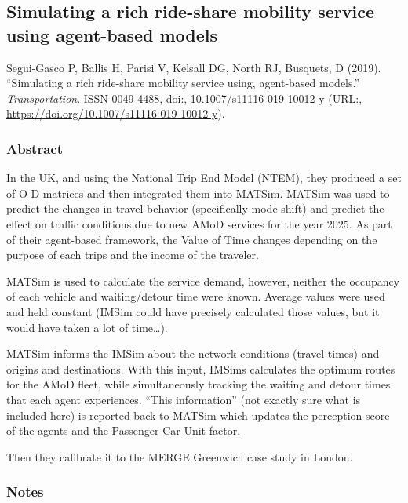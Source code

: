 \documentclass[]{article}
\begin{document}
\hypertarget{simulating-a-rich-ride-share-mobility-service-using-agent-based-models}{%
\subsection{Simulating a rich ride-share mobility service using
agent-based
models}\label{simulating-a-rich-ride-share-mobility-service-using-agent-based-models}}

Segui-Gasco P, Ballis H, Parisi V, Kelsall DG, North RJ, Busquets, D
(2019). ``Simulating a rich ride-share mobility service using,
agent-based models.'' \emph{Transportation}. ISSN 0049-4488, doi:,
10.1007/s11116-019-10012-y (URL:,
\url{https://doi.org/10.1007/s11116-019-10012-y}).

\hypertarget{abstract-2}{%
\subsubsection{Abstract}\label{abstract-2}}

In the UK, and using the National Trip End Model (NTEM), they produced a
set of O-D matrices and then integrated them into MATSim. MATSim was
used to predict the changes in travel behavior (specifically mode shift)
and predict the effect on traffic conditions due to new AMoD services
for the year 2025. As part of their agent-based framework, the Value of
Time changes depending on the purpose of each trips and the income of
the traveler.

MATSim is used to calculate the service demand, however, neither the
occupancy of each vehicle and waiting/detour time were known. Average
values were used and held constant (IMSim could have precisely
calculated those values, but it would have taken a lot of time\ldots).

MATSim informs the IMSim about the network conditions (travel times) and
origins and destinations. With this input, IMSims calculates the optimum
routes for the AMoD fleet, while simultaneously tracking the waiting and
detour times that each agent experiences. ``This information'' (not
exactly sure what is included here) is reported back to MATSim which
updates the perception score of the agents and the Passenger Car Unit
factor.

Then they calibrate it to the MERGE Greenwich case study in London.

\hypertarget{notes-2}{%
\subsubsection{Notes}\label{notes-2}}
\end{document}
